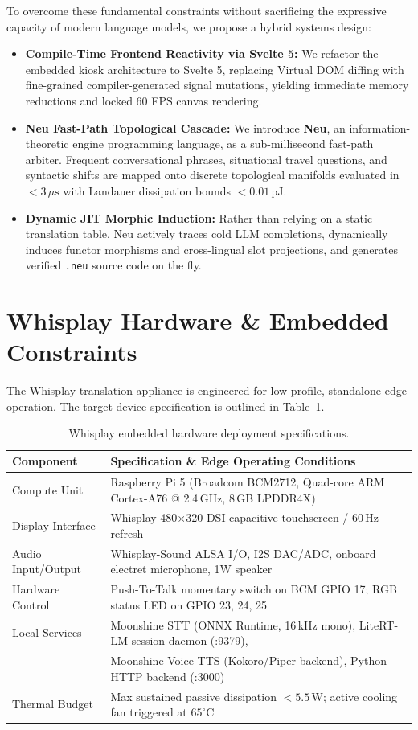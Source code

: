 \documentclass[11pt]{article}
\begin{document}
To overcome these fundamental constraints without sacrificing the expressive capacity of modern language models, we propose a hybrid systems design:
\begin{itemize}
    \item \textbf{Compile-Time Frontend Reactivity via Svelte 5:} We refactor the embedded kiosk architecture to Svelte 5, replacing Virtual DOM diffing with fine-grained compiler-generated signal mutations, yielding immediate memory reductions and locked 60 FPS canvas rendering.
    \item \textbf{Neu Fast-Path Topological Cascade:} We introduce \textbf{Neu}, an information-theoretic engine programming language, as a sub-millisecond fast-path arbiter. Frequent conversational phrases, situational travel questions, and syntactic shifts are mapped onto discrete topological manifolds evaluated in $< 3\,\mu\text{s}$ with Landauer dissipation bounds $< 0.01\,\text{pJ}$.
    \item \textbf{Dynamic JIT Morphic Induction:} Rather than relying on a static translation table, Neu actively traces cold LLM completions, dynamically induces functor morphisms and cross-lingual slot projections, and generates verified \texttt{.neu} source code on the fly.
\end{itemize}

\section{Whisplay Hardware \& Embedded Constraints}

The Whisplay translation appliance is engineered for low-profile, standalone edge operation. The target device specification is outlined in Table~\ref{tab:hardware_spec}.

\begin{table}[h!]
\centering
\small
\begin{tabularx}{\linewidth}{lX}
\toprule
\textbf{Component} & \textbf{Specification \& Edge Operating Conditions} \\
\midrule
Compute Unit & Raspberry Pi 5 (Broadcom BCM2712, Quad-core ARM Cortex-A76 @ 2.4\,GHz, 8\,GB LPDDR4X) \\
Display Interface & Whisplay 480$\times$320 DSI capacitive touchscreen / 60\,Hz refresh \\
Audio Input/Output & Whisplay-Sound ALSA I/O, I2S DAC/ADC, onboard electret microphone, 1W speaker \\
Hardware Control & Push-To-Talk momentary switch on BCM GPIO 17; RGB status LED on GPIO 23, 24, 25 \\
Local Services & Moonshine STT (ONNX Runtime, 16\,kHz mono), LiteRT-LM session daemon (:9379), \\
 & Moonshine-Voice TTS (Kokoro/Piper backend), Python HTTP backend (:3000) \\
Thermal Budget & Max sustained passive dissipation $< 5.5\,\text{W}$; active cooling fan triggered at $65^\circ\text{C}$ \\
\bottomrule
\end{tabularx}
\caption{Whisplay embedded hardware deployment specifications.}
\label{tab:hardware_spec}
\end{table}
\end{document}
